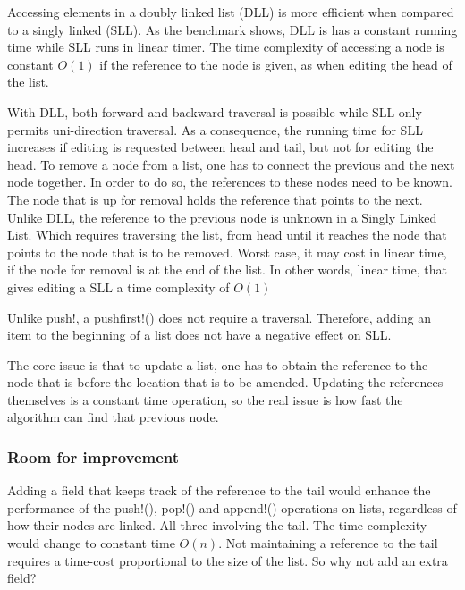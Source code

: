\documentclass[a4paper, 11pt]{article}
\begin{document}
Accessing elements in a doubly linked list (DLL) is more efficient when compared to a
singly linked (SLL). As the benchmark shows, DLL is
has a constant running time while SLL runs in linear timer.
The time complexity of accessing a node 
is constant $O(1)$ if the reference to the node is given, as when editing the
head of the list. 

With DLL, both forward and backward traversal is possible 
while SLL only permits uni-direction traversal. As a consequence, 
the running time for SLL increases if editing is requested between head and tail, 
but not for editing the head. To remove a node from a list, 
one has to connect the previous and the next node together. 
In order to do so, the references to these nodes need to be known. 
The node that is up for removal holds the reference that points to the next. 
Unlike DLL, the reference to the previous node is unknown in a Singly Linked List.
Which requires traversing the list, from head until it reaches the node that 
points to the node that is to be removed. Worst case, it may cost in linear time,
if the node for removal is at the end of the list. In other words, linear time,
that gives editing a SLL a time complexity of $O(1)$ 

Unlike push!, a pushfirst!() does not
require a traversal. Therefore, adding an item to the beginning 
of a list does not have a negative effect on SLL.  

The core issue is that to update a list, one has to obtain the 
reference to the node that is before the location that is to be amended. 
Updating the references themselves is a
constant time operation, so the real issue is how fast the algorithm can 
find that previous node. 

\subsubsection*{Room for improvement}
Adding a field that keeps track of the reference to the tail would enhance the 
performance of the push!(), pop!() and append!() operations on lists, regardless of how
their nodes are linked. All three involving the tail. 
The time complexity would change to constant time
$O(n)$.  Not maintaining a reference to the tail requires a time-cost proportional to the 
size of the list. So why not add an extra field? 
\end{document}
